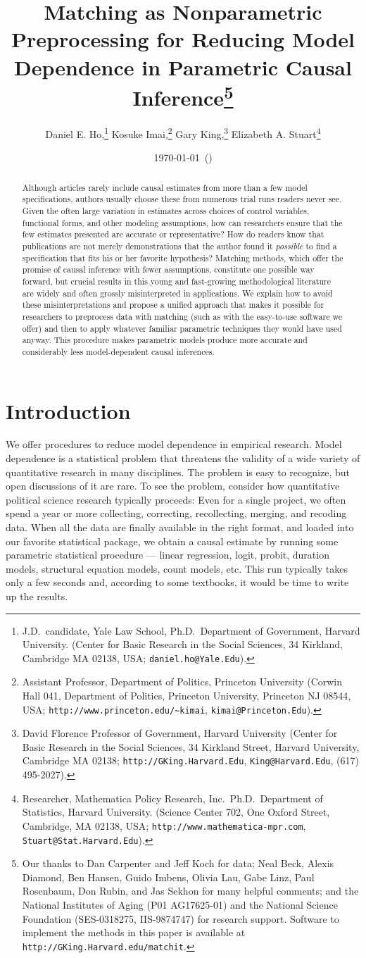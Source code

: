 \documentclass[11pt,titlepage]{article}
\title{Matching as Nonparametric Preprocessing for Reducing Model
  Dependence in Parametric Causal Inference\thanks{Our thanks to Dan
    Carpenter and Jeff Koch for data; Neal Beck, Alexis Diamond, Ben
    Hansen, Guido Imbens, Olivia Lau, Gabe Linz, Paul Rosenbaum, Don
    Rubin, and Jas Sekhon for many helpful comments; and the National
    Institutes of Aging (P01 AG17625-01) and the National Science
    Foundation (SES-0318275, IIS-9874747) for research support.
    Software to implement the methods in this paper is available at
    \texttt{http://GKing.Harvard.edu/matchit}.}}
\author{Daniel E. Ho,\thanks{J.D.\ candidate, Yale Law School, Ph.D.\,
    Department of Government, Harvard University. (Center for Basic
    Research in the Social Sciences, 34 Kirkland, Cambridge MA 02138,
    USA; \texttt{daniel.ho@Yale.Edu}).}
  Kosuke Imai,\thanks{Assistant Professor, Department of Politics,
    Princeton University (Corwin Hall 041, Department of Politics,
    Princeton University, Princeton NJ 08544, USA;
    \texttt{http://www.princeton.edu/\~{}kimai},
    \texttt{kimai@Princeton.Edu}).}
  Gary King,\thanks{David Florence Professor of Government, Harvard
    University (Center for Basic Research in the Social Sciences, 34
    Kirkland Street, Harvard University, Cambridge MA 02138;
    \texttt{http://GKing.Harvard.Edu}, \texttt{King@Harvard.Edu},
    (617) 495-2027).}
Elizabeth A. Stuart\thanks{Researcher, Mathematica Policy Research,
  Inc.\, Ph.D.\, Department of Statistics, Harvard University.
  (Science Center 702, One Oxford Street, Cambridge, MA 02138, USA;
  \texttt{http://www.mathematica-mpr.com},
  \texttt{Stuart@Stat.Harvard.Edu}).}}
\date{\today\ (\printtime)}
\begin{document}
\maketitle

\begin{abstract}
  Although articles rarely include causal estimates from more than a
  few model specifications, authors usually choose these from numerous
  trial runs readers never see.  Given the often large variation in
  estimates across choices of control variables, functional forms, and
  other modeling assumptions, how can researchers ensure that the few
  estimates presented are accurate or representative?  How do readers
  know that publications are not merely demonstrations that the author
  found it \emph{possible} to find a specification that fits his or
  her favorite hypothesis?  Matching methods, which offer the promise
  of causal inference with fewer assumptions, constitute one possible
  way forward, but crucial results in this young and fast-growing
  methodological literature are widely and often grossly
  misinterpreted in applications.  We explain how to avoid these
  misinterpretations and propose a unified approach that makes it
  possible for researchers to preprocess data with matching (such as
  with the easy-to-use software we offer) and then to apply whatever
  familiar parametric techniques they would have used anyway.  This
  procedure makes parametric models produce more accurate and
  considerably less model-dependent causal inferences.
\end{abstract}

\section{Introduction}

We offer procedures to reduce model dependence in empirical research.
Model dependence is a statistical problem that threatens the validity
of a wide variety of quantitative research in many disciplines.  The
problem is easy to recognize, but open discussions of it are rare.  To
see the problem, consider how quantitative political science research
typically proceeds: Even for a single project, we often spend a year
or more collecting, correcting, recollecting, merging, and recoding
data.  When all the data are finally available in the right format,
and loaded into our favorite statistical package, we obtain a causal
estimate by running some parametric statistical procedure --- linear
regression, logit, probit, duration models, structural equation
models, count models, etc.  This run typically takes only a few
seconds and, according to some textbooks, it would be time to write up
the results.
\end{document}
